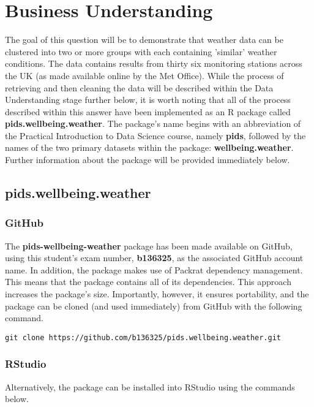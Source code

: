 \documentclass[12pt, oneside, openany]{book}
\begin{document}
\section*{Business Understanding}
The goal of this question will be to demonstrate that weather data can be clustered into two or more groups with each containing 'similar' weather conditions. The data contains results from thirty six monitoring stations across the UK (as made available online by the Met Office). While the process of retrieving and then cleaning the data will be described within the Data Understanding stage further below, it is worth noting that all of the process described within this answer have been implemented as an R package called \textbf{pids.wellbeing.weather}. The package's name begins with an abbreviation of the Practical Introduction to Data Science course, namely \textbf{pids}, followed by the names of the two primary datasets within the package: \textbf{wellbeing.weather}. Further information about the package will be provided immediately below.

\subsection*{pids.wellbeing.weather}

\subsubsection*{GitHub}
The \textbf{pids-wellbeing-weather} package has been made available on GitHub\cite{pids.wellbeing.weather}, using this student's exam number, \textbf{b136325}, as the associated GitHub account name. In addition, the package makes use of Packrat\cite{packrat} dependency management. This means that the package contains all of its dependencies. This approach increases the package's size. Importantly, however, it ensures portability, and the package can be cloned (and used immediately) from GitHub with the following command.

\begin{verbatim}
git clone https://github.com/b136325/pids.wellbeing.weather.git
\end{verbatim}

\subsubsection*{RStudio}
Alternatively, the package can be installed into RStudio using the commands below.
\end{document}

